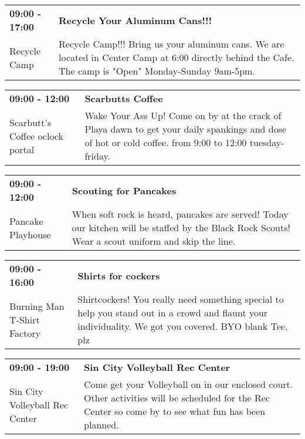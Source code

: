\begin{tabular}{ p{1in} p{2.2in} }
    \textbf{09:00 - 17:00} & \textbf{Recycle Your Aluminum Cans!!!} \\
    Recycle Camp \newline  & Recycle Camp!!! Bring us your aluminum cans. We are located in Center Camp at 6:00 directly behind the Cafe. The camp is "Open" Monday-Sunday 9am-5pm. \\
    \hline 
\end{tabular}
    
\begin{tabular}{ p{1in} p{2.2in} }
    \textbf{09:00 - 12:00} & \textbf{Scarbutts Coffee} \\
    Scarbutt's Coffee \newline 9 oclock portal & Wake Your Ass Up! Come on by at the crack of Playa dawn to get your daily spankings and dose of hot or cold coffee. from 9:00 to 12:00 tuesday-friday. \\
    \hline 
\end{tabular}
    
\begin{tabular}{ p{1in} p{2.2in} }
    \textbf{09:00 - 12:00} & \textbf{Scouting for Pancakes} \\
    Pancake Playhouse \newline  & When soft rock is heard, pancakes are served!  Today our kitchen will be staffed by the Black Rock Scouts!  Wear a scout uniform and skip the line. \\
    \hline 
\end{tabular}
    
\begin{tabular}{ p{1in} p{2.2in} }
    \textbf{09:00 - 16:00} & \textbf{Shirts for cockers} \\
    Burning Man T-Shirt Factory \newline  & Shirtcockers! You really need something special to help you stand out in a crowd and flaunt your individuality. We got you covered. BYO blank Tee, plz \\
    \hline 
\end{tabular}
    
\begin{tabular}{ p{1in} p{2.2in} }
    \textbf{09:00 - 19:00} & \textbf{Sin City Volleyball Rec Center} \\
    Sin City Volleyball Rec Center \newline  & Come get your Volleyball on in our enclosed court. Other activities will be scheduled for the Rec Center so come by to see what fun has been planned. \\
    \hline 
\end{tabular}
    
